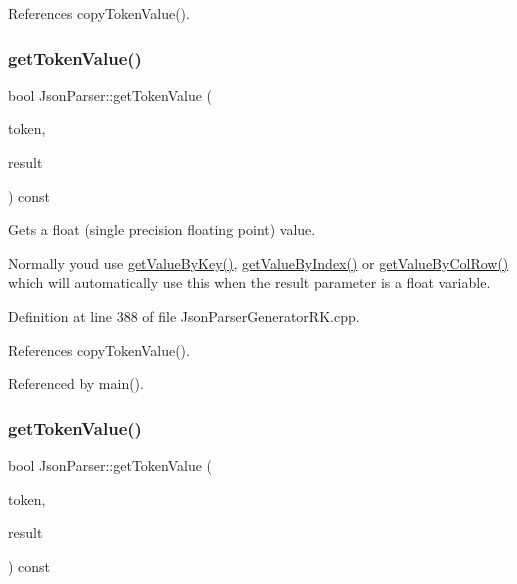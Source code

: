 References copy\+Token\+Value().

\mbox{\label{class_json_parser_a37a6ad66b9697ceb6b789b4c9abaa3ab}} 
\subsubsection{\texorpdfstring{get\+Token\+Value()}{getTokenValue()}\hspace{0.1cm}{\footnotesize\ttfamily [4/8]}}
{\footnotesize\ttfamily bool Json\+Parser\+::get\+Token\+Value (\begin{DoxyParamCaption}\item[{const \hyperlink{struct_json_parser_generator_r_k_1_1jsmntok__t}{Json\+Parser\+Generator\+R\+K\+::jsmntok\+\_\+t} $\ast$}]{token,  }\item[{float \&}]{result }\end{DoxyParamCaption}) const}



Gets a float (single precision floating point) value. 

Normally you\textquotesingle{}d use \hyperlink{class_json_parser_a13abcdcb2341f65ac358bb4d81007d06}{get\+Value\+By\+Key()}, \hyperlink{class_json_parser_a53bd8a6ebb0d9b246b876653e792368f}{get\+Value\+By\+Index()} or \hyperlink{class_json_parser_af1f4a3a65b5cc9cd19b129c410aa78e0}{get\+Value\+By\+Col\+Row()} which will automatically use this when the result parameter is a float variable. 

Definition at line 388 of file Json\+Parser\+Generator\+R\+K.\+cpp.



References copy\+Token\+Value().



Referenced by main().

\mbox{\label{class_json_parser_af378b1400c3f091ae6ba67dc588ca863}} 
\subsubsection{\texorpdfstring{get\+Token\+Value()}{getTokenValue()}\hspace{0.1cm}{\footnotesize\ttfamily [5/8]}}
{\footnotesize\ttfamily bool Json\+Parser\+::get\+Token\+Value (\begin{DoxyParamCaption}\item[{const \hyperlink{struct_json_parser_generator_r_k_1_1jsmntok__t}{Json\+Parser\+Generator\+R\+K\+::jsmntok\+\_\+t} $\ast$}]{token,  }\item[{double \&}]{result }\end{DoxyParamCaption}) const}



